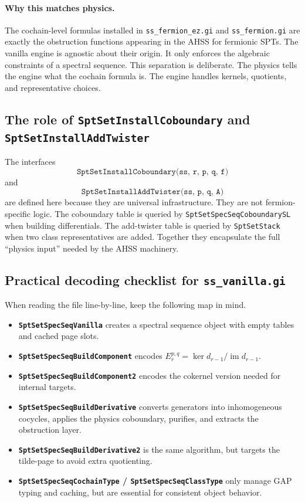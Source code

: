 \documentclass{SciPost}
\begin{document}
\paragraph{Why this matches physics.}
The cochain-level formulas installed in \texttt{ss\_fermion\_ez.gi} and \texttt{ss\_fermion.gi} are exactly the obstruction functions appearing in the AHSS for fermionic SPTs.
The vanilla engine is agnostic about their origin.
It only enforces the algebraic constraints of a spectral sequence.
This separation is deliberate.
The physics tells the engine what the cochain formula is.
The engine handles kernels, quotients, and representative choices.

\subsection{The role of \texttt{SptSetInstallCoboundary} and \texttt{SptSetInstallAddTwister}}

The interfaces
\begin{equation}
\texttt{SptSetInstallCoboundary(ss, r, p, q, f)}
\end{equation}
and
\begin{equation}
\texttt{SptSetInstallAddTwister(ss, p, q, A)}
\end{equation}
are defined here because they are universal infrastructure.
They are not fermion-specific logic.
The coboundary table is queried by \texttt{SptSetSpecSeqCoboundarySL} when building differentials.
The add-twister table is queried by \texttt{SptSetStack} when two class representatives are added.
Together they encapsulate the full ``physics input'' needed by the AHSS machinery.

\subsection{Practical decoding checklist for \texttt{ss\_vanilla.gi}}

When reading the file line-by-line, keep the following map in mind.

\begin{itemize}
    \item \textbf{\texttt{SptSetSpecSeqVanilla}} creates a spectral sequence object with empty tables and cached page slots.
    \item \textbf{\texttt{SptSetSpecSeqBuildComponent}} encodes $E_r^{p,q} = \ker d_{r-1} / \operatorname{im} d_{r-1}$.
    \item \textbf{\texttt{SptSetSpecSeqBuildComponent2}} encodes the cokernel version needed for internal targets.
    \item \textbf{\texttt{SptSetSpecSeqBuildDerivative}} converts generators into inhomogeneous cocycles, applies the physics coboundary, purifies, and extracts the obstruction layer.
    \item \textbf{\texttt{SptSetSpecSeqBuildDerivative2}} is the same algorithm, but targets the tilde-page to avoid extra quotienting.
    \item \textbf{\texttt{SptSetSpecSeqCochainType} / \texttt{SptSetSpecSeqClassType}} only manage GAP typing and caching, but are essential for consistent object behavior.
\end{itemize}
\end{document}

